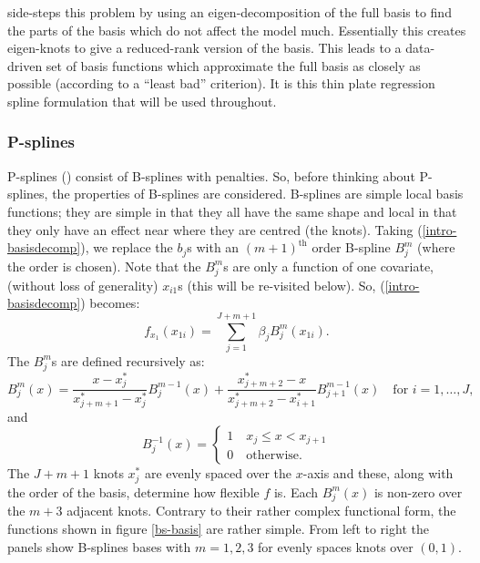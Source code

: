  side-steps this problem by using an eigen-decomposition of the full basis to find the parts of the basis which do not affect the model much. Essentially this creates eigen-knots to give a reduced-rank version of the basis. This leads to a data-driven set of basis functions which approximate the full basis as closely as possible (according to a ``least bad'' criterion). It is this thin plate regression spline formulation that will be used throughout. 

\subsubsection{P-splines}

P-splines (\cite{eilersmarx96}) consist of B-splines with penalties. So, before thinking about P-splines, the properties of B-splines are considered. B-splines are simple local basis functions; they are simple in that they all have the same shape and local in that they only have an effect near where they are centred (the knots). Taking (\ref{intro-basisdecomp}), we replace the $b_j$s with an $(m+1)^\text{th}$ order B-spline $B_j^m$ (where the order is chosen). Note that the $B_j^m$s are only a function of one covariate, (without loss of generality) $x_{i1}$s (this will be re-visited below). So, (\ref{intro-basisdecomp}) becomes:
\begin{equation*}
f_{x_1}(x_{1i}) = \sum_{j=1}^{J+m+1} \beta_j B^m_j(x_{1i}).
\end{equation*}
The $B_j^m$s are defined recursively as:
\begin{equation*}
B_j^m(x) = \frac{x-x^*_j}{x^*_{j+m+1} - x^*_j} B_j^{m-1}(x) + \frac{x^*_{j+m+2} -x}{x^*_{j+m+2} - x^*_{i+1}} B_{j+1}^{m-1}(x) \quad \text{for } i=1,\ldots,J,
\end{equation*}
and
\begin{equation*}
 B_j^{-1}(x)=\begin{cases}
1 \quad x_j \leq x < x_{j+1}\\
0 \quad \text{otherwise}. 
\end{cases}
\end{equation*}
The $J+m+1$ knots $x^*_j$ are evenly spaced over the $x$-axis and these, along with the order of the basis, determine how flexible $f$ is. Each $B^m_j(x)$ is non-zero over the $m+3$ adjacent knots. Contrary to their rather complex functional form, the functions shown in figure \ref{bs-basis} are rather simple. From left to right the panels show B-splines bases with $m=1,2,3$ for evenly spaces knots over $(0,1)$.


